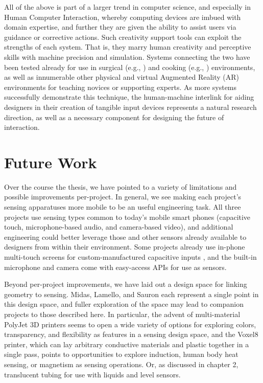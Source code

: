 All of the above is part of a larger trend in computer science, and especially in Human Computer Interaction, whereby computing devices are imbued with domain expertise, and further they are given the ability to assist users via guidance or corrective actions. Such creativity support tools can exploit the strengths of each system. That is, they marry human creativity and perceptive skills with machine precision and simulation. Systems connecting the two have been tested already for use in surgical (e.g., \cite{kahol-surgical}) and cooking (e.g., \cite{sato-mimicook}) environments, as well as innumerable other physical and virtual Augmented Reality (AR) environments for teaching novices or supporting experts. As more systems successfully demonstrate this technique, the human-machine interlink for aiding designers in their creation of tangible input devices represents a natural research direction, as well as a necessary component for designing the future of interaction.

\section{Future Work}

Over the course the thesis, we have pointed to a variety of limitations and possible improvements per-project. In general, we see making each project's sensing apparatuses more mobile to be an useful engineering task. All three projects use sensing types common to today's mobile smart phones (capacitive touch, microphone-based audio, and camera-based video), and additional engineering could better leverage those and other sensors already available to designers from within their environment. Some projects already use in-phone multi-touch screens for custom-manufactured capacitive inputs \cite{chan-capstones,chang-clipon}, and the built-in microphone and camera come with easy-access APIs for use as sensors.

Beyond per-project improvements, we have laid out a design space for linking geometry to sensing. Midas, Lamello, and Sauron each represent a single point in this design space, and fuller exploration of the space may lead to companion projects to those described here. In particular, the advent of multi-material PolyJet 3D printers seems to open a wide variety of options for exploring colors, transparency, and flexibility as features in a sensing design space, and the Voxel8 \cite{voxel8} printer, which can lay arbitrary conductive materials and plastic together in a single pass, points to opportunities to explore induction, human body heat sensing, or magnetism as sensing operations. Or, as discussed in chapter 2, translucent tubing for use with liquids and level sensors.

